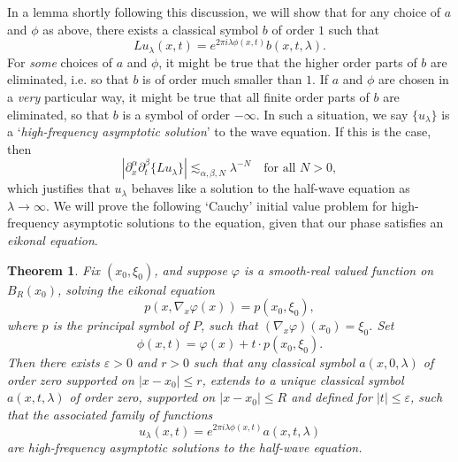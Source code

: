 \documentclass{article}
\theoremstyle{plain}
\newtheorem{theorem}{Theorem}
\theoremstyle{remark}
\theoremstyle{definition}
\begin{document}
%
%
%

In a lemma shortly following this discussion, we will show that for any choice of $a$ and $\phi$ as above, there exists a classical symbol $b$ of order $1$ such that
%
\[ L u_\lambda(x,t) = e^{2 \pi i \lambda \phi(x,t)} b(x,t,\lambda). \]
%
For \emph{some} choices of $a$ and $\phi$, it might be true that the higher order parts of $b$ are eliminated, i.e. so that $b$ is of order much smaller than $1$. If $a$ and $\phi$ are chosen in a \emph{very} particular way, it might be true that all finite order parts of $b$ are eliminated, so that $b$ is a symbol of order $-\infty$. In such a situation, we say $\{ u_\lambda \}$ is a `\emph{high-frequency asymptotic solution}' to the wave equation. If this is the case, then
%
\[ |\partial_x^\alpha \partial_t^\beta \{ L u_\lambda \}| \lesssim_{\alpha,\beta,N} \lambda^{-N} \quad\text{for all $N > 0$}, \]
which justifies that $u_\lambda$ behaves like a solution to the half-wave equation as $\lambda \to \infty$. We will prove the following `Cauchy' initial value problem for high-frequency asymptotic solutions to the equation, given that our phase satisfies an \emph{eikonal equation}.

\begin{theorem}
	Fix $(x_0,\xi_0)$, and suppose $\varphi$ is a smooth-real valued function on $B_R(x_0)$, solving the eikonal equation
	\[ p(x, \nabla_x \varphi(x) ) = p(x_0,\xi_0), \]
	where $p$ is the principal symbol of $P$, such that $(\nabla_x \varphi)(x_0) = \xi_0$. Set
	\[ \phi(x,t) = \varphi(x) + t \cdot p(x_0,\xi_0). \]
	Then there exists $\varepsilon > 0$ and $r > 0$ such that any classical symbol $a(x,0,\lambda)$ of order zero supported on $|x - x_0| \leq r$, extends to a unique classical symbol $a(x,t,\lambda)$ of order zero, supported on $|x - x_0| \leq R$ and defined for $|t| \leq \varepsilon$, such that the associated family of functions
	\[ u_\lambda(x,t) = e^{2 \pi i \lambda \phi(x,t)} a(x,t,\lambda) \]
	are high-frequency asymptotic solutions to the half-wave equation.
\end{theorem}
\end{document}
